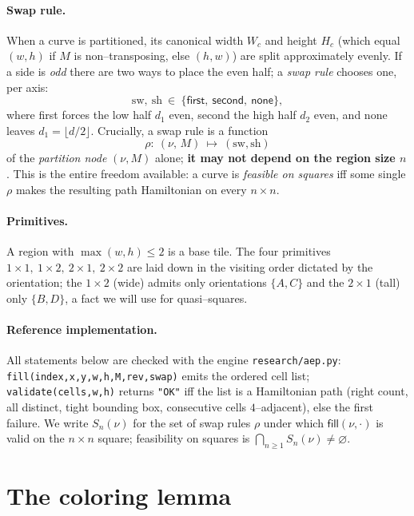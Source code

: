 \documentclass[11pt]{article}
\theoremstyle{definition}
\newcommand{\Fill}{\textsf{fill}}
\begin{document}
\paragraph{Swap rule.} When a curve is partitioned, its canonical width $W_c$ and height
$H_c$ (which equal $(w,h)$ if $M$ is non--transposing, else $(h,w)$) are split
approximately evenly. If a side is \emph{odd} there are two ways to place the even half; a
\emph{swap rule} chooses one, per axis:
\[
   \mathrm{sw},\ \mathrm{sh}\ \in\ \{\textsf{first},\ \textsf{second},\ \textsf{none}\},
\]
where \textsf{first} forces the low half $d_1$ even, \textsf{second} the high half $d_2$
even, and \textsf{none} leaves $d_1=\lfloor d/2\rfloor$. Crucially, a swap rule is a
function
\[
   \rho:\ (\nu,\,M)\ \longmapsto\ (\mathrm{sw},\mathrm{sh})
\]
of the \emph{partition node} $(\nu,M)$ alone; \textbf{it may not depend on the region size
$n$}. This is the entire freedom available: a curve is \emph{feasible on squares} iff some
single $\rho$ makes the resulting path Hamiltonian on every $n\times n$.

\paragraph{Primitives.} A region with $\max(w,h)\le 2$ is a base tile. The four primitives
$1\times1,\ 1\times2,\ 2\times1,\ 2\times2$ are laid down in the visiting order dictated by
the orientation; the $1\times2$ (wide) admits only orientations $\{A,C\}$ and the
$2\times1$ (tall) only $\{B,D\}$, a fact we will use for quasi--squares.

\paragraph{Reference implementation.} All statements below are checked with the engine
\texttt{research/aep.py}: \texttt{fill(index,x,y,w,h,M,rev,swap)} emits the ordered cell
list; \texttt{validate(cells,w,h)} returns \texttt{"OK"} iff the list is a Hamiltonian path
(right count, all distinct, tight bounding box, consecutive cells $4$--adjacent), else the
first failure. We write $S_n(\nu)$ for the set of swap rules $\rho$ under which
$\Fill(\nu,\cdot)$ is valid on the $n\times n$ square; feasibility on squares is
$\bigcap_{n\ge1}S_n(\nu)\neq\varnothing$.

\section{The coloring lemma}\label{sec:color}
\end{document}
